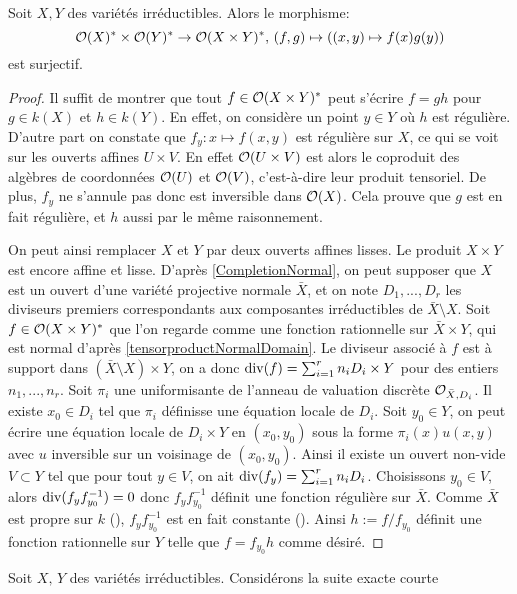 \begin{prop}
Soit $X, Y$ des variétés irréductibles. Alors le morphisme:
$$\mathcal{O}(X)^*\times\mathcal{O}(Y)^*\rightarrow\mathcal{O}(X\times Y)^*,\,(f,g)\mapsto ((x,y )\mapsto f(x)g(y))$$
est surjectif.
\end{prop}
\begin{proof}
Il suffit de montrer que tout $f\in \mathcal{O}(X\times Y)^*$ peut s'écrire $f=gh$ pour $g\in k(X)$ et $h\in k(Y)$. En effet, on considère un point $y\in Y$ où $h$ est régulière. D'autre part on constate que $f_y:x\mapsto f(x,y)$ est régulière sur $X$, ce qui se voit sur les ouverts affines $U\times V$. En effet $\mathcal{O}(U\times V)$ est alors le coproduit des algèbres de coordonnées $\mathcal{O}(U)$ et $\mathcal{O}(V)$, c'est-à-dire leur produit tensoriel. De plus, $f_y$ ne s'annule pas donc est inversible dans $\mathcal{O}(X)$. Cela prouve que $g$ est en fait régulière, et $h$ aussi par le même raisonnement.

On peut ainsi remplacer $X$ et $Y$ par deux ouverts affines lisses. Le produit  $X\times Y$ est encore affine et lisse. D'après \ref{CompletionNormal}, on peut supposer que $X$ est un ouvert d'une variété projective normale $\bar{X}$, et on note $D_1,...,D_r$ les diviseurs premiers correspondants aux composantes irréductibles de $\bar{X}\setminus X$. Soit $f\in \mathcal{O}(X\times Y)^*$ que l'on regarde comme une fonction rationnelle sur $\bar{X}\times Y$, qui est normal d'après \ref{tensorproductNormalDomain}. Le diviseur associé à $f$ est à support dans $(\bar{X}\setminus X)\times Y$, on a donc $\operatorname{div}(f)=\sum_{i=1}^rn_iD_i\times Y$ pour des entiers $n_1,...,n_r$. Soit $\pi_i$ une uniformisante de l'anneau de valuation discrète $\mathcal{O}_{\bar{X},D_i}$. Il existe $x_0\in D_i$ tel que $\pi_i$ définisse une équation locale de $D_i$. Soit $y_0\in Y$, on peut écrire une équation locale de $D_i\times Y$ en $(x_0,y_0)$ sous la forme $\pi_i(x)u(x,y)$ avec $u$ inversible sur un voisinage de $(x_0,y_0)$. Ainsi il existe un ouvert non-vide $V\subset Y$ tel que pour tout $y\in V$, on ait $\operatorname{div}(f_y)=\sum_{i=1}^rn_iD_i$. Choisissons $y_0\in V$, alors $\operatorname{div}(f_yf_{y_0}^{-1})=0$ donc $f_yf_{y_0}^{-1}$ définit une fonction régulière sur $\bar{X}$. Comme $\bar{X}$ est propre sur $k$ (\cite[II.4.9]{Hartshorne}), $f_yf_{y_0}^{-1}$ est en fait constante (\cite[ex II.4.4]{Hartshorne}). Ainsi $h:=f/f_{y_0}$ définit une fonction rationnelle sur $Y$ telle que $f=f_{y_0}h$ comme désiré.
\end{proof}

\noindent Soit $X,\,Y$ des variétés irréductibles. Considérons la suite exacte courte

